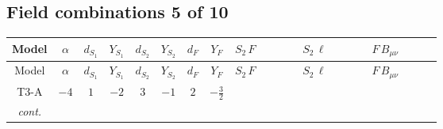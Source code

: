 \documentclass[8pt]{article}
\begin{document}
\begin{landscape}
\subsection*{Field combinations 5 of 10}
\begin{longtable}{@{}cccccccc >{\raggedright\arraybackslash}p{0.21\linewidth} >{\raggedright\arraybackslash}p{0.21\linewidth} >{\raggedright\arraybackslash}p{0.21\linewidth}@{}}
\toprule
Model & $\alpha$ & $d_{S_1}$ & $Y_{S_1}$ & $d_{S_2}$ & $Y_{S_2}$ & $d_F$ & $Y_F$ & $S_2\,F$ & $S_2\,\ell$ & $F\,B_{\mu\nu}$ \\
\midrule
\endfirsthead
\toprule
Model & $\alpha$ & $d_{S_1}$ & $Y_{S_1}$ & $d_{S_2}$ & $Y_{S_2}$ & $d_F$ & $Y_F$ & $S_2\,F$ & $S_2\,\ell$ & $F\,B_{\mu\nu}$ \\
\midrule
\endhead
T3-A & $-4$ & $1$ & $-2$ & $3$ & $-1$ & $2$ & $-\frac{3}{2}$ & \scriptsize\adjustbox{max width=\linewidth}{$\begin{gathered} +\frac{2}{3} \hbar  \log \left(\frac{\bar{\mu}^{2}}{M_F^2}\right) \overline{y_{2,i_1,r_1}} \overline{y_{2,i_2,r_2}} S_{2,j_2}^2 y_{2,i_1,r_2} y_{2,i_2,r_1} \left(S_{2,j_1}{}^{\dagger }\right){}^2 \\ +\frac{2 C_{S_2^\dagger S_2} \hbar  \log \left(\frac{\bar{\mu}^{2}}{M_F^2}\right) \overline{y_{2,i_1,r_1}} S_{2,j_1} y_{2,i_1,r_1} S_{2,j_1}{}^{\dagger }}{\sqrt{3}} \\ -\frac{4}{3} \hbar  \log \left(\frac{\bar{\mu}^{2}}{M_F^2}\right) \overline{y_{2,i_1,r_1}} \overline{y_{2,i_2,r_2}} S_{2,j_1} S_{2,j_2} y_{2,i_1,r_2} y_{2,i_2,r_1} S_{2,j_1}{}^{\dagger } S_{2,j_2}{}^{\dagger }\end{gathered}$} &  & \scriptsize\adjustbox{max width=\linewidth}{$\begin{gathered} -\frac{9}{2} \hbar  \log \left(\frac{\bar{\mu}^{2}}{M_F^2}\right) B_{\mu _1\mu _2}^2\end{gathered}$} \\
\textit{cont.} &  &  &  &  &  &  &  & \scriptsize\adjustbox{max width=\linewidth}{$\begin{gathered} -\frac{2 \hbar  \log \left(\frac{\bar{\mu}^{2}}{M_F^2}\right) \overline{y_{2,i_1,r_1}} S_{2,j_3} S_{2,j_4} y_{2,i_1,r_1} S_{2,j_1}{}^{\dagger } S_{2,j_2}{}^{\dagger } \mathcal{I}_{S_2,j_1,j_3,j_2,j_4}{}^1 \lambda_{S_2}^{(1)}}{\sqrt{3}} \\ -\frac{2 \hbar  \log \left(\frac{\bar{\mu}^{2}}{M_F^2}\right) \overline{y_{2,i_1,r_1}} S_{2,j_3} S_{2,j_4} y_{2,i_1,r_1} S_{2,j_1}{}^{\dagger } S_{2,j_2}{}^{\dagger } \mathcal{I}_{S_2,j_1,j_3,j_2,j_4}{}^2 \lambda_{S_2}^{(2)}}{\sqrt{3}}\end{gathered}$} &  &  \\

\end{longtable}
\end{landscape}
\end{document}
